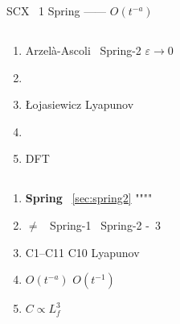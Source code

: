 SCX ~1 \textit{}Spring \textit{}—— $O(t^{-a})$

\subsection{}


\begin{enumerate}[nosep]
    \item  Arzel\`{a}-Ascoli ~Spring-2  $\varepsilon \to 0$ 
    \item 
    \item  {\L}ojasiewicz  Lyapunov 
    \item 
    \item  DFT 
\end{enumerate}

\subsection{}



\begin{enumerate}[nosep]
    \item \textbf{Spring } ~\ref{sec:spring2} """"

    \item \textbf{ $\neq$ } ~Spring-1 ~Spring-2 -~3

    \item \textbf{} C1--C11  C10  Lyapunov 

    \item \textbf{}  $O(t^{-a})$  $O(t^{-1})$ 

    \item \textbf{}  $C \propto L_f^3$
\end{enumerate}

